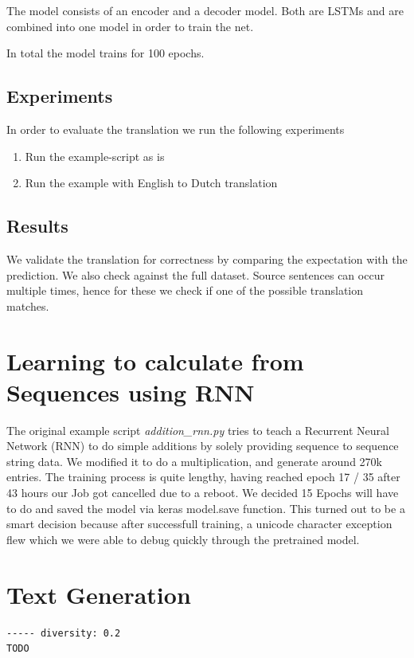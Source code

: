 \documentclass{article}[]
\begin{document}
The model consists of an encoder and a decoder model.
Both are LSTMs and are combined into one model in order to train the net.

In total the model trains for 100 epochs.

\subsection{Experiments}
In order to evaluate the translation we run the following experiments

\begin{enumerate}
	\item{Run the example-script as is}
	\item{Run the example with English to Dutch translation}
\end{enumerate}

\subsection{Results}
We validate the translation for correctness by comparing the expectation with the prediction.
We also check against the full dataset.
Source sentences can occur multiple times, hence for these we check if one of the possible translation matches.







\section{Learning to calculate from Sequences using RNN}
\label{sec:rnn}

The original example script \textit{addition\_rnn.py}\cite{kerasexamples} tries to teach a Recurrent Neural Network (RNN) to do simple additions by solely providing sequence to sequence string data.
We modified it to do a multiplication, and generate around 270k entries. The training process is quite lengthy, having reached epoch 17 / 35 after 43 hours our Job got cancelled due to a reboot.
We decided 15 Epochs will have to do and saved the model via keras model.save function. This turned out to be a smart decision because after successfull training, a unicode character exception flew which we were able to debug quickly through the pretrained model.

\appendix
\section{Text Generation}
\begin{lstlisting}[label=nietzsche-low-diverse, caption={Nietzsche after 60 epochs}]
----- diversity: 0.2
TODO
\end{lstlisting}
\end{document}
